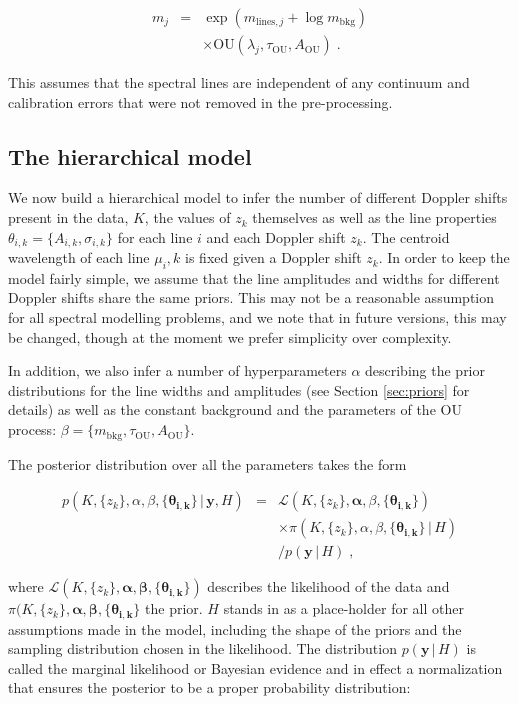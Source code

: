 \documentclass[12pt]{emulateapj}
\newcommand{\given}{\,|\,}
\newcommand{\counts}{y}
\newcommand{\pars}{\theta}
\newcommand{\mean}{m}
\newcommand{\likelihood}{{\mathcal L}}
\newcommand{\bkg}{\mathrm{bkg}}
\begin{document}
\begin{eqnarray}
\label{eqn:modelflux}
m_j & = & \exp{(m_{\mathrm{lines},j} + \log{m_{\mathrm{bkg}}})} \\ \nonumber
	& & \times \mathrm{OU}(\lambda_j, \tau_{\mathrm{OU}}, A_{\mathrm{OU}}) \; .
\end{eqnarray}

\noindent This assumes that the spectral lines are independent of any continuum and calibration errors that were not removed in the pre-processing. 

\subsection{The hierarchical model}
\label{sec:hierarchicalmodel}
We now build a hierarchical model to infer the number of different Doppler shifts present in the data, $K$, the values of $z_k$ themselves as well as the line properties ${\pars_{i,k}} = \{A_{i,k}, \sigma_{i,k}\}$ for each line $i$ and each Doppler shift $z_k$. The centroid wavelength of each line $\mu_i,k$ is fixed given a Doppler shift $z_k$. In order to keep the model fairly simple, we assume that the line amplitudes and widths for different Doppler shifts share the same priors. This may not be a reasonable assumption for all spectral modelling problems, and we note that in future versions, this may be changed, though at the moment we prefer simplicity over complexity. 

In addition, we also infer a number of hyperparameters $\alpha$ describing the prior distributions for the line widths and amplitudes (see Section \ref{sec:priors} for details) as well as the constant background and the parameters of the OU process: $\beta = \{\mean_{\bkg}, \tau_{\mathrm{OU}}, A_{\mathrm{OU}}\}$.

The posterior distribution over all the parameters takes the form

\begin{eqnarray}
p(K, \{z_k\}, \alpha, \beta, \{\bm{\pars_{i,k}}\} \given  \bm{\counts}, H) & = & \likelihood(K, \{z_k\}, \bm{\alpha}, \beta, \{\bm{\pars_{i,k}}\}) \\\nonumber
					& & \times \pi(K, \{z_k\}, \alpha, \beta, \{\bm{\pars_{i,k}}\} \given H) \\\nonumber
					& &  / p(\bm{\counts} \given H)\; ,
\end{eqnarray} 

\noindent where $\likelihood(K, \{z_k\}, \bm{\alpha}, \bm{\beta}, \{\bm{\pars_{i,k}}\})$ describes the likelihood of the data and $\pi(K, \{z_k\}, \bm{\alpha}, \bm{\beta}, \{\bm{\pars_{i,k}}\} $ the prior. $H$ stands in as a place-holder for all other assumptions made in the model, including the shape of the priors and the sampling distribution chosen in the likelihood. The distribution $p(\bm{\counts} \given H)$ is called the marginal likelihood or Bayesian evidence and in effect a normalization that ensures the posterior to be a proper probability distribution:
\end{document}
